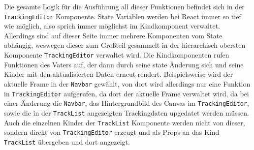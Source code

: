Die gesamte Logik für die Ausführung all dieser Funktionen befindet sich in der \texttt{TrackingEditor} Komponente. State Variablen werden bei React immer so tief wie möglich, also sprich immer möglichst im Kindkomponent verwaltet. Allerdings sind auf dieser Seite immer mehrere Komponenten vom State abhängig, weswegen dieser zum Großteil gesammelt in der hierarchisch obersten Komponente \texttt{TrackingEditor} verwaltet wird. Die Kindkomponenten rufen Funktionen des Vaters auf, der dann durch seine state Änderung sich und seine Kinder mit den aktualisierten Daten erneut rendert. Beispielsweise wird der aktuelle Frame in der \texttt{Navbar} gewählt, von dort wird allerdings nur eine Funktion in \texttt{TrackingEditor} aufgerufen, da dort der aktuelle Frame verwaltet wird, da bei einer Änderung die \texttt{Navbar}, das Hintergrundbild des Canvas im \texttt{TrackingEditor}, sowie die in der \texttt{TrackList} angezeigten Trackingdaten upgedatet werden müssen. Auch die einzelnen Kinder der \texttt{TrackList} Komponente werden nicht von dieser, sondern direkt von \texttt{TrackingEditor} erzeugt und als Props an das Kind \texttt{TrackList} übergeben und dort angezeigt. \\
\\
